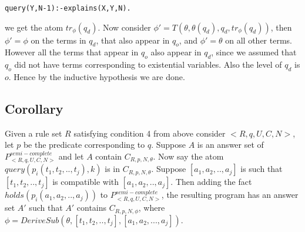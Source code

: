\documentclass{article}
\begin{document}
\begin{verbatim}
query(Y,N-1):-explains(X,Y,N).    
\end{verbatim}
we get the atom $tr_{\phi}(q_{d})$. Now consider $\phi'= T(\theta, \theta(q_{d}), q_{d}, tr_{\phi}(q_{d}))$, then $\phi'=\phi$ on the terms in $q_{d}$, that also appear in $q_{o}$, and $\phi' = \theta$ on all other terms. However all the terms that appear in $q_{o}$ also appear in $q_{d}$, since we assumed that $q_{o}$ did not have terms corresponding to existential variables. Also the level of $q_{d}$ is $o$. Hence by the inductive hypothesis we are done.
\begin{figure}

    \begin{center}
\end{center}
\end{figure}

 
\subsection{Corollary}
Given a rule set $R$ satisfying condition 4 from above consider $<R,q,U,C,N>$, let $p$ be the predicate corresponding to $q$. Suppose $A$ is an answer set of $P^{semi-complete}_{<R,q,U,C,N>}$ and let $A$ contain $C_{R,p,N,\theta}$. Now say the atom $query(p_{i}(t_{1},t_{2},..,t_{j}),k)$ is in $C_{R,p,N,\theta}$. Suppose $[a_{1},a_{2},..,a_{j}]$ is such that $[t_{1},t_{2},..,t_{j}]$ is compatible with $[a_{1},a_{2},..,a_{j}]$. Then adding the fact $holds(p_{i}(a_{1},a_{2},..,a_{j}))$ to $P^{semi-complete}_{<R,q,U,C,N>}$, the resulting program has an answer set $A'$ such that $A'$ contains $C_{R,p,N,\phi}$, where $\phi = DeriveSub(\theta, [t_{1},t_{2},..,t_{j}],[a_{1},a_{2},...,a_{j}])$. 
\end{document}

